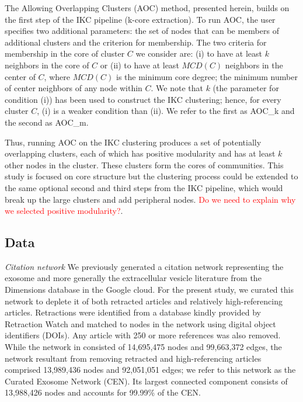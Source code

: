 \documentclass[12pt, oneside]{article}   	%
\begin{document}
The Allowing Overlapping Clusters (AOC) method, presented herein, builds on the first step of the IKC pipeline (k-core extraction). To run AOC, the user specifies two additional parameters:  
the set of nodes that can be members of  additional clusters and the criterion for membership.  The two criteria for membership in the core of cluster $C$ we consider are: (i) to have at least $k$ neighbors 
in the core of $C$ or (ii) to have at least $MCD(C)$ neighbors in the center of $C$, where $MCD(C)$ is the minimum core degree; the minimum number of center neighbors of any node within $C$. 
We note that $k$ (the parameter for condition (i)) has been used to construct the IKC clustering; hence, for every cluster $C$,  (i) is a weaker condition than (ii).
We refer to the first as AOC\_k and the second as AOC\_m.

Thus, running   AOC on the IKC clustering produces a set of potentially overlapping clusters, each of which has positive modularity and has at least $k$ other nodes in the cluster. These clusters form the cores of communities.  This study is focused on core structure but the clustering process could be extended to the same optional second and third steps from the IKC pipeline, which would break up the large clusters and add peripheral nodes. \textcolor{red}{Do we need to explain why we selected positive modularity?}.

\subsection{Data} 
\emph{Citation network} We previously generated a citation network \citep{Wedell2022} representing the exosome \citep{harding1983} and more generally the extracellular vesicle literature \citep{raposo2021} from the Dimensions database \citep{hook2018dimensions} in the Google cloud. For the present study, we curated this network to deplete it of both retracted articles and relatively high-referencing articles. 
Retractions were identified from a database kindly provided by Retraction Watch and matched to nodes in the network using digital object identifiers (DOIs). Any article with 250 or more references was also removed. 
While the network in \cite{Wedell2022} consisted of 14,695,475 nodes and 99,663,372 edges, the network resultant from removing retracted and high-referencing articles comprised 13,989,436 nodes and 92,051,051 edges; we refer to this network as the Curated Exosome Network (CEN). Its largest connected component consists of 13,988,426 nodes and accounts for 99.99\% of the CEN.
\end{document}
